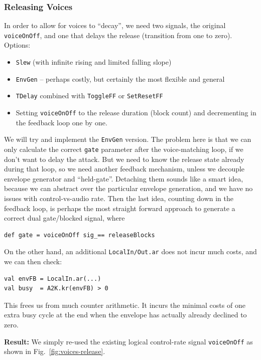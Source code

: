 \documentclass[11pt,a4paper]{article}
\newcommand{\figref}[1]{Fig.~\ref{#1}}
\begin{document}
\subsubsection*{Releasing Voices}

In order to allow for voices to ``decay'', we need two signals, the original \Verb!voiceOnOff!, and one that delays the release (transition from one to zero). Options:
%
\begin{itemize}
\item \Verb!Slew! (with infinite rising and limited falling slope)
\item \Verb!EnvGen! -- perhaps costly, but certainly the most flexible and general
\item \Verb!TDelay! combined with \Verb!ToggleFF! or \Verb!SetResetFF!
\item Setting \Verb!voiceOnOff! to the release duration (block count) and decrementing in the feedback loop one by one.
\end{itemize}
%
We will try and implement the \Verb!EnvGen! version. The problem here is that we can only calculate the correct \Verb!gate! parameter after the voice-matching loop, if we don't want to delay the attack. But we need to know the release state already during that loop, so we need another feedback mechanism, unless we decouple envelope generator and ``held-gate''. Detaching them sounds like a smart idea, because we can abstract over the particular envelope generation, and we have no issues with control-vs-audio rate. Then the last idea, counting down in the feedback loop, is perhaps the most straight forward approach to generate a correct dual gate/blocked signal, where 
%
\begin{verbatim}
def gate = voiceOnOff sig_== releaseBlocks
\end{verbatim}
%
On the other hand, an additional \Verb!LocalIn/Out.ar! does not incur much costs, and we can then check:
%
\begin{verbatim}
val envFB = LocalIn.ar(...)
val busy  = A2K.kr(envFB) > 0
\end{verbatim}
%
This frees us from much counter arithmetic. It incurs the minimal costs of one extra busy cycle at the end when the envelope has actually already declined to zero.

\textbf{Result:} We simply re-used the existing logical control-rate signal \Verb!voiceOnOff! as shown in \figref{fig:voices-release}.
\end{document}
